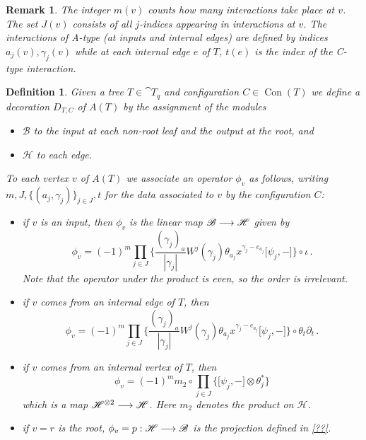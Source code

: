 \documentclass[english,letter paper,12pt,leqno]{article}
\theoremstyle{example}
\newtheorem{definition}[theorem]{Definition}
\newtheorem{remark}[theorem]{Remark}
\numberwithin{equation}{section}
\def\be{\begin{equation}}
\def\ee{\end{equation}}
\begin{document}
\begin{remark} The integer $m(v)$ counts \emph{how many} interactions take place at $v$. The set $J(v)$ consists of all $j$-indices appearing in interactions at $v$. The interactions of A-type (at inputs and internal edges) are defined by indices $a_j(v), \gamma_j(v)$ while at each internal edge $e$ of $T$, $t(e)$ is the index of the C-type interaction.
\end{remark}

\begin{definition} Given a tree $T \in \cat{T}_q$ and configuration $C \in \operatorname{Con}(T)$ we define a decoration $D_{T,C}$ of $A(T)$ by the assignment of the modules
\begin{itemize}
\item $\mathscr{B}$ to the input at each non-root leaf and the output at the root, and
\item $\mathscr{H}$ to each edge.
\end{itemize}
To each vertex $v$ of $A(T)$ we associate an operator $\phi_v$ as follows, writing $m, J, \{ (a_j, \gamma_j) \}_{j \in J}, t$ for the data associated to $v$ by the configuration $C$:
\begin{itemize}
\item if $v$ is an input, then $\phi_v$ is the linear map $\mathscr{B} \longrightarrow \mathscr{H}$ given by
\be\label{eq:int_input}
\phi_v = (-1)^m \prod_{j \in J}\Big\{ \frac{(\gamma_j)_a}{|\gamma_j|} W^j( \gamma_j)  \theta_{a_j} x^{\gamma_j - e_{a_j}} \big[ \psi_j, - \big] \Big\} \circ \iota\,.
\ee
Note that the operator under the product is even, so the order is irrelevant.
\item if $v$ comes from an internal edge of $T$, then
\be\label{eq:int_intedge}
\phi_v = (-1)^m \prod_{j \in J} \Big\{ \frac{(\gamma_j)_a}{|\gamma_j|} W^j( \gamma_j)  \theta_{a_j} x^{\gamma_j - e_{a_j}} \big[ \psi_j, - \big] \Big\} \circ \theta_t \partial_t\,.
\ee
\item if $v$ comes from an internal vertex of $T$, then
\be\label{eq:int_intvert}
\phi_v = (-1)^m m_2 \circ \prod_{j \in J} \Big\{ \big[ \psi_j, - \big] \otimes \theta_j^* \Big\}
\ee
which is a map $\mathscr{H}^{\otimes 2} \longrightarrow \mathscr{H}$. Here $m_2$ denotes the product on $\mathscr{H}$.
\item if $v = r$ is the root, $\phi_v = p: \mathscr{H} \longrightarrow \mathscr{B}$ is the projection defined in \eqref{??}.
\end{itemize}
\end{definition}
\end{document}
